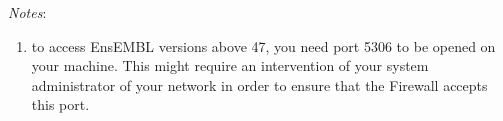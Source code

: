 \documentclass[12pt,a4paper, oneside]{scrreprt} %
\begin{document}





\emph{Notes}: 
\begin{enumerate}
\item to access EnsEMBL versions above 47, you need port 5306 to be
  opened on your machine. This might require an intervention of your
  system administrator of your network in order to ensure that the
  Firewall accepts this port.
\end{enumerate}
\end{document}
